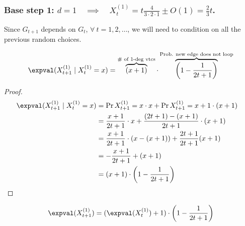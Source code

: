 \subsubsection{\large{Base step 1: $d = 1 \quad \implies \quad X_t^{(1)} = t\frac{4}{3 \cdot 2 \cdot 1} \pm O(1) = \frac{2}{3}t$.}}
    
Since $G_{t + 1}$ depends on $G_t$, $\forall\ t = 1,2,\ldots$, we will need to condition on all the previous random choices.

\begin{lem}\label{l:pref-att-1}
    \[
        \expval( X_{t + 1}^{(1)} \mathrel{|} X_{t}^{(1)} = x ) = \overbrace{(x + 1)}^{\text{\# of 1-deg vtcs}} \cdot \overbrace{\left( 1 - \frac{1}{2t + 1} \right)}^{\text{Prob. new edge does not loop}}
    \]
\end{lem}

\begin{proof}
    \begin{align*}
        \expval( X_{t+1}^{(1)} \mathrel{|} X_{t}^{(1)} = x ) &=
        \Pr{X_{t+1}^{\left(1\right)} = x} \cdot x + \Pr{X_{t+1}^{\left(1\right)} = x+1} \cdot (x+1)&\\
        &= \frac{x + 1}{2t + 1} \cdot x + \frac{(2t+1) - (x+1)}{2t+1} \cdot (x+1)&\\
        &= \frac{x+1}{2t+1} \cdot \left( x - (x+1) \right) + \frac{2t+1}{2t+1} (x+1)&\\
        &= - \frac{x+1}{2t+1} + (x+1)&\\
        &= (x+1) \cdot \left( 1 - \frac{1}{2t+1} \right)&
    \end{align*}
\end{proof}

\begin{lem}\label{l:pref-att-2}
    \[
        \expval( X_{t + 1}^{(1)} ) = ( \expval( X_{t}^{(1)} ) + 1 ) \cdot \left( 1 - \frac{1}{2t+1} \right)
    \]
\end{lem}


